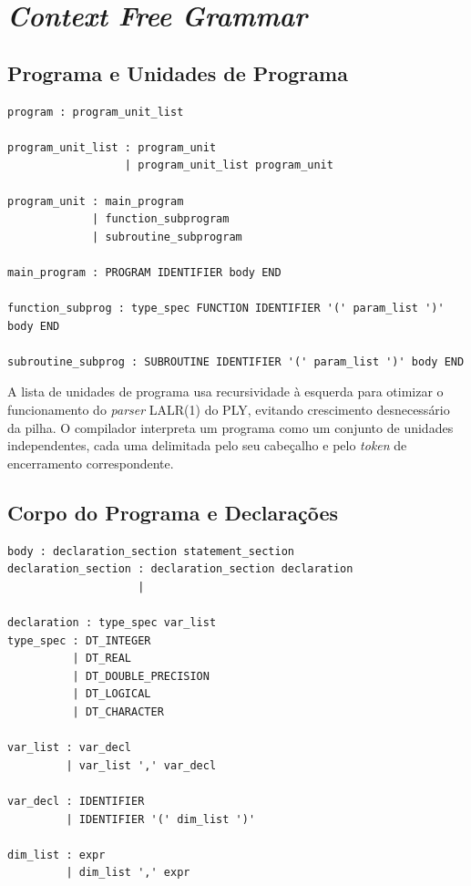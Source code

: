 \documentclass[11pt, a4paper, fleqn]{article}
\begin{document}
\section{\textit{Context Free Grammar}}

\subsection{Programa e Unidades de Programa}

\begin{lstlisting}
program : program_unit_list

program_unit_list : program_unit
                  | program_unit_list program_unit

program_unit : main_program
             | function_subprogram
             | subroutine_subprogram

main_program : PROGRAM IDENTIFIER body END

function_subprog : type_spec FUNCTION IDENTIFIER '(' param_list ')' body END

subroutine_subprog : SUBROUTINE IDENTIFIER '(' param_list ')' body END
\end{lstlisting}

\noindent A lista de unidades de programa usa recursividade à esquerda para otimizar o funcionamento do \textit{parser} LALR(1) do PLY, evitando crescimento desnecessário da pilha. O compilador interpreta um programa como um conjunto de unidades independentes, cada uma delimitada pelo seu cabeçalho e pelo \textit{token} de encerramento correspondente.

\subsection{Corpo do Programa e Declarações}

\begin{lstlisting}
body : declaration_section statement_section
declaration_section : declaration_section declaration
                    |

declaration : type_spec var_list
type_spec : DT_INTEGER
          | DT_REAL
          | DT_DOUBLE_PRECISION
          | DT_LOGICAL
          | DT_CHARACTER

var_list : var_decl
         | var_list ',' var_decl

var_decl : IDENTIFIER
         | IDENTIFIER '(' dim_list ')'

dim_list : expr
         | dim_list ',' expr
\end{lstlisting}
\end{document}
